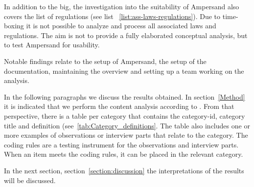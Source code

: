 
In addition to the \acrshort{big}, the investigation into the suitability of Ampersand also covers the list of regulations (see list ~\ref{list:ass-laws-regulations}).
Due to time-boxing it is not possible to analyze and process all associated laws and regulations.
The aim is not to provide a fully elaborated conceptual analysis, but to test Ampersand for usability.

Notable findings relate to the setup of Ampersand, the setup of the documentation, maintaining the overview and setting up a team working on the analysis.

In the following paragraphs we discuss the results obtained.
In section~\ref{Method} it is indicated that we perform the content analysis according to \cite{mayring_qualitative_2000}.
From that perspective, there is a table per category that contains the category-id, category title and definition (see~\ref{tab:Category_definitions}.
The table also includes one or more examples of observations or interview parts that relate to the category.
The coding rules are a testing instrument for the observations and interview parts.
When an item meets the coding rules, it can be placed in the relevant category.

In the next section, section~\ref{section:discussion} the interpretations of the results will be discussed.







